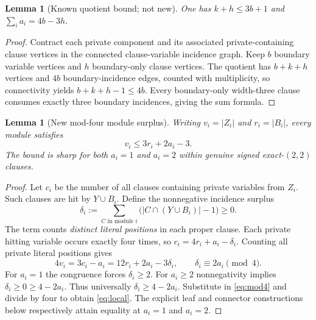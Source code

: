 \documentclass[11pt]{article}
\newtheorem{lemma}[theorem]{Lemma}
\begin{document}
\begin{lemma}[Known quotient bound; not new]\label{lem:quotient}
One has $k+h\le3b+1$ and $\sum_i a_i=4b-3h$.
\end{lemma}
\begin{proof}
Contract each private component and its associated private-containing clause vertices in the connected clause-variable incidence graph. Keep $b$ boundary variable vertices and $h$ boundary-only clause vertices. The quotient has $b+k+h$ vertices and $4b$ boundary-incidence edges, counted with multiplicity, so connectivity yields $b+k+h-1\le4b$. Every boundary-only width-three clause consumes exactly three boundary incidences, giving the sum formula.
\end{proof}

\begin{lemma}[New mod-four module surplus]\label{lem:parity}
Writing $v_i=|Z_i|$ and $r_i=|B_i|$, every module satisfies
\begin{equation}\label{eq:local}
 \boxed{v_i\le3r_i+2a_i-3.}
\end{equation}
The bound is sharp for both $a_i=1$ and $a_i=2$ within genuine signed exact-$(2,2)$ clauses.
\end{lemma}
\begin{proof}
Let $c_i$ be the number of all clauses containing private variables from $Z_i$. Such clauses are hit by $Y\cup B_i$. Define the nonnegative incidence surplus
\[
 \delta_i:=\sum_{C\text{ in module }i}\bigl(|C\cap(Y\cup B_i)|-1\bigr)\ge0.
\]
The term counts \emph{distinct literal positions} in each proper clause. Each private hitting variable occurs exactly four times, so $c_i=4r_i+a_i-\delta_i$. Counting all private literal positions gives
\begin{equation}\label{eq:mod4}
 4v_i=3c_i-a_i=12r_i+2a_i-3\delta_i,
 \qquad \delta_i\equiv2a_i\pmod4.
\end{equation}
For $a_i=1$ the congruence forces $\delta_i\ge2$. For $a_i\ge2$ nonnegativity implies $\delta_i\ge0\ge4-2a_i$. Thus universally $\delta_i\ge4-2a_i$. Substitute in \eqref{eq:mod4} and divide by four to obtain \eqref{eq:local}. The explicit leaf and connector constructions below respectively attain equality at $a_i=1$ and $a_i=2$.
\end{proof}
\end{document}
